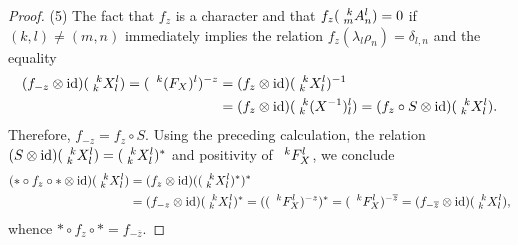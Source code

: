 \begin{proof}
     (5) The fact that $f_{z}$ is a character and
     that $f_{z}(\Gr{A}{k}{l}{m}{n})=0$ if $(k,l)\neq (m,n)$
     immediately implies the relation
     $f_{z}(\lambda_{l}\rho_{n})=\delta_{l,n}$  and the equality
     \begin{align*}
       (f_{-z} \otimes \id) (\Gr{X}{k}{l}{k}{l})=
       (\Gru{(F_{X})}{k}{l})^{-z} &= (f_{z} \otimes
       \id)(\Gr{X}{k}{l}{k}{l})^{-1} \\ &= (f_{z} \otimes
       \id)(\Gr{(X^{-1})}{k}{l}{k}{l}) = (f_{z} \circ S \otimes
       \id)(\Gr{X}{k}{l}{k}{l}).
     \end{align*}
Therefore, $f_{-z} = f_{z} \circ S$. Using the preceding calculation,
     the relation $(S \otimes \id)(\Gr{X}{k}{l}{k}{l}) =
     (\Gr{X}{k}{l}{k}{l})^{*}$ and positivity of $\Gru{F_{X}}{k}{l}$,
     we conclude
     \begin{align*}
       (\ast \circ f_{z} \circ \ast \otimes
       \id)(\Gr{X}{k}{l}{k}{l})
&=       (f_{z} \otimes
       \id)((\Gr{X}{k}{l}{k}{l})^{*})^{*} \\
& = (f_{-z} \otimes \id)(\Gr{X}{k}{l}{k}{l})^{*} 
 =
((\Gru{F_{X}}{k}{l})^{-z})^{*} 
=       (\Gru{F_{X}}{k}{l})^{-\overline{z}} = (f_{-\overline{z}}
\otimes \id)(\Gr{X}{k}{l}{k}{l}),
     \end{align*}
whence $\ast \circ f_{z} \circ \ast = f_{-\overline{z}}$.
\end{proof}


